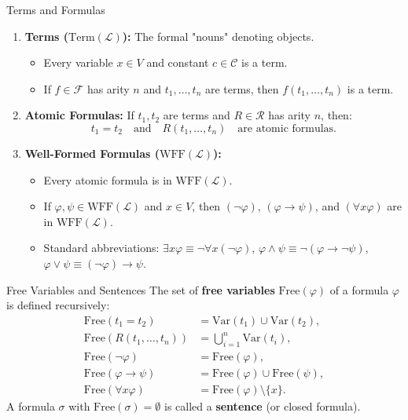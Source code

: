 \begin{definitionbox}{Terms and Formulas}
\begin{enumerate}[leftmargin=1.4em,itemsep=3pt]
  \item \textbf{Terms ($\mathrm{Term}(\mathcal{L})$):} The formal "nouns" denoting objects.
  \begin{itemize}[leftmargin=1.2em,itemsep=1pt]
    \item Every variable $x \in V$ and constant $c \in \mathcal{C}$ is a term.
    \item If $f \in \mathcal{F}$ has arity $n$ and $t_1, \dots, t_n$ are terms, then $f(t_1, \dots, t_n)$ is a term.
  \end{itemize}
  \item \textbf{Atomic Formulas:} If $t_1, t_2$ are terms and $R \in \mathcal{R}$ has arity $n$, then:
  \[
  t_1 = t_2 \quad \text{and} \quad R(t_1, \dots, t_n) \quad \text{are atomic formulas.}
  \]
  \item \textbf{Well-Formed Formulas ($\mathrm{WFF}(\mathcal{L})$):}
  \begin{itemize}[leftmargin=1.2em,itemsep=1pt]
    \item Every atomic formula is in $\mathrm{WFF}(\mathcal{L})$.
    \item If $\varphi, \psi \in \mathrm{WFF}(\mathcal{L})$ and $x \in V$, then $(\neg \varphi)$, $(\varphi \to \psi)$, and $(\forall x \varphi)$ are in $\mathrm{WFF}(\mathcal{L})$.
    \item Standard abbreviations: $\exists x \varphi \equiv \neg \forall x (\neg \varphi)$, $\varphi \land \psi \equiv \neg(\varphi \to \neg \psi)$, $\varphi \lor \psi \equiv (\neg \varphi) \to \psi$.
  \end{itemize}
\end{enumerate}
\end{definitionbox}

\begin{definitionbox}{Free Variables and Sentences}
The set of \textbf{free variables} $\mathrm{Free}(\varphi)$ of a formula $\varphi$ is defined recursively:
\begin{align*}
\mathrm{Free}(t_1 = t_2) &= \mathrm{Var}(t_1) \cup \mathrm{Var}(t_2), \\
\mathrm{Free}(R(t_1, \dots, t_n)) &= \bigcup_{i=1}^n \mathrm{Var}(t_i), \\
\mathrm{Free}(\neg \varphi) &= \mathrm{Free}(\varphi), \\
\mathrm{Free}(\varphi \to \psi) &= \mathrm{Free}(\varphi) \cup \mathrm{Free}(\psi), \\
\mathrm{Free}(\forall x \varphi) &= \mathrm{Free}(\varphi) \setminus \{x\}.
\end{align*}
A formula $\sigma$ with $\mathrm{Free}(\sigma) = \emptyset$ is called a \textbf{sentence} (or closed formula).
\end{definitionbox}

